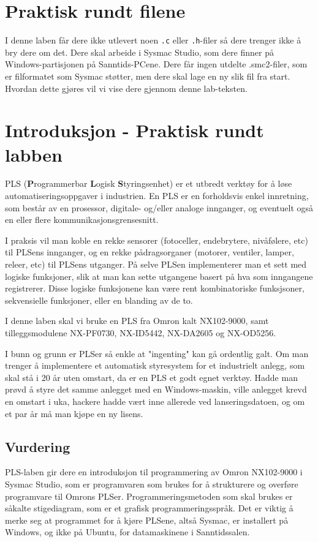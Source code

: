 \begin{alphasection}
\section{Praktisk rundt filene}

I denne laben får dere ikke utlevert noen \verb|.c| eller \verb|.h|-filer så dere trenger ikke å bry dere om det. Dere skal arbeide i Sysmac Studio, som dere finner på Windows-partisjonen på Sanntids-PCene. Dere får ingen utdelte .smc2-filer, som er filformatet som Sysmac støtter, men dere skal lage en ny slik fil fra start. Hvordan dette gjøres vil vi vise dere gjennom denne lab-teksten.

\section{Introduksjon - Praktisk rundt labben}


PLS (\textbf{P}rogrammerbar \textbf{L}ogisk \textbf{S}tyringsenhet) er et utbredt verktøy for å løse automatiseringsoppgaver i industrien. En PLS er en forholdsvis enkel innretning, som består av en prosessor, digitale- og/eller analoge innganger, og eventuelt også en eller flere kommunikasjonsgrensesnitt.

I praksis vil man koble en rekke sensorer (fotoceller, endebrytere, nivåfølere, etc) til PLSens innganger, og en rekke pådragsorganer (motorer, ventiler, lamper, releer, etc) til PLSens utganger. På selve PLSen implementerer man et sett med logiske funksjoner, slik at man kan sette utgangene basert på hva som inngangene registrerer. Disse logiske funksjonene kan være rent kombinatoriske funksjsoner, sekvensielle funksjoner, eller en blanding av de to.

I denne laben skal vi bruke en PLS fra Omron kalt NX102-9000, samt tilleggsmodulene NX-PF0730, NX-ID5442, NX-DA2605 og NX-OD5256.

I bunn og grunn er PLSer så enkle at "ingenting" kan gå ordentlig galt. Om man trenger å implementere et automatisk styresystem for et industrielt anlegg, som skal stå i 20 år uten omstart, da er en PLS et godt egnet verktøy. Hadde man prøvd å styre det samme anlegget med en Windows-maskin, ville anlegget krevd en omstart i uka, hackere hadde vært inne allerede ved lanseringsdatoen, og om et par år må man kjøpe en ny lisens.

\subsection*{Vurdering}
PLS-laben gir dere en introduksjon til programmering av Omron NX102-9000 i Sysmac Studio, som er programvaren som brukes for å strukturere og overføre programvare til Omrons PLSer. Programmeringsmetoden som skal brukes er såkalte stigediagram, som er et grafisk programmeringsspråk. Det er viktig å merke seg at programmet for å kjøre PLSene, altså Sysmac, er installert på Windows, og ikke på Ubuntu, for datamaskinene i Sanntidssalen.\\


\end{alphasection}
